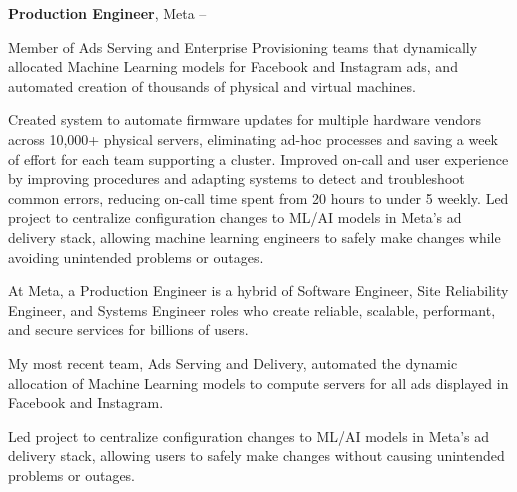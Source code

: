 \documentclass[letterpaper,MMMMyyyy,nonstopmode]{simpleresumecv}
\begin{document}
\begin{Body}
\BigGap

\Entry
\textbf{Production Engineer}, Meta
\hfill
{} -- 


\Gap
\begin{Detail}
Member of Ads Serving and Enterprise Provisioning teams that dynamically allocated Machine Learning models for Facebook and Instagram ads, and automated creation of thousands of physical and virtual machines.

\Gap 

\BulletItem
	Created system to automate firmware updates for multiple hardware vendors across 10,000+ physical servers, eliminating ad-hoc processes and saving a week of effort for each team supporting a cluster.
\BulletItem
	Improved on-call and user experience by improving procedures and adapting systems to detect and troubleshoot common errors, reducing on-call time spent from 20 hours to under 5 weekly.
\BulletItem
	Led project to centralize configuration changes to ML/AI models in Meta’s ad delivery stack, allowing machine learning engineers to safely make changes while avoiding unintended problems or outages.

\iffalse 	%

At Meta, a Production Engineer is a hybrid of Software Engineer, Site Reliability Engineer, and Systems Engineer roles
who create reliable, scalable, performant, and secure services for billions of users.

\Gap

My most recent team, Ads Serving and Delivery, automated the dynamic allocation of Machine Learning models to compute servers for all ads displayed in Facebook and Instagram.

\BulletItem
Led project to centralize configuration changes to ML/AI models in Meta's ad delivery stack, allowing users to safely make changes without causing unintended problems or outages.


\end{Detail}
\end{Body}
\end{document}
